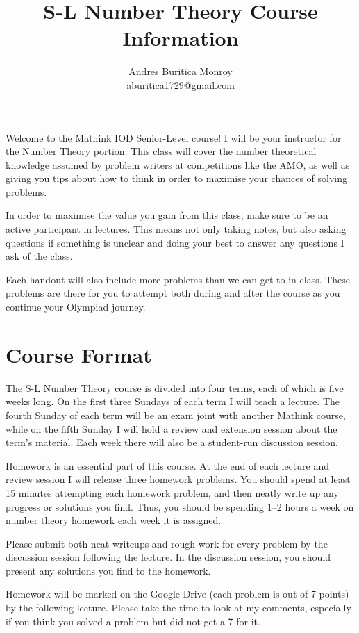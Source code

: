 \documentclass{article}
\title{S-L Number Theory Course Information}
\author{Andres Buritica Monroy \\
\href{mailto:aburitica1729@gmail.com}{aburitica1729@gmail.com}}
\date{}
\begin{document}
\maketitle
Welcome to the Mathink IOD Senior-Level course! I will be your instructor for the
Number Theory portion. This class will cover the number theoretical knowledge
assumed by problem writers at competitions like the AMO, as well as giving you
tips about how to think in order to maximise your chances of solving problems.

In order to maximise the value you gain from this class, make sure to be an
active participant in lectures. This means not only taking notes, but also
asking questions if something is unclear and doing your best to answer any
questions I ask of the class.

Each handout will also include more problems than we can get to in class. These
problems are there for you to attempt both during and after the course as you
continue your Olympiad journey.
\section{Course Format}
The S-L Number Theory course is divided into four terms, each of which is five
weeks long. On the first three Sundays of each term I will teach a lecture. The
fourth Sunday of each term will be an exam joint with another Mathink course,
while on the fifth Sunday I will hold a review and extension session about the
term's material. Each week there will also be a student-run discussion session.

Homework is an essential part of this course. At the end of each lecture and
review session I will release three homework problems. You should spend at
least 15 minutes attempting each homework problem, and then neatly write up any
progress or solutions you find. Thus, you should be spending 1--2 hours a week
on number theory homework each week it is assigned.

Please submit both neat writeups and rough work
for every problem by the discussion session following the lecture. In the
discussion session, you should present any solutions you find to the homework.

Homework will be marked on the Google Drive (each problem is out of 7 points)
by the following lecture. Please
take the time to look at my comments, especially if you think you solved a
problem but did not get a 7 for it.
\newpage
\end{document}
